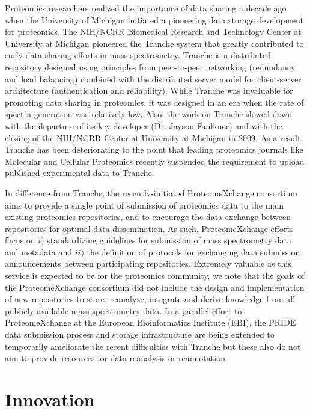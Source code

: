 \documentclass[arial,11pt]{article}
\begin{document}
Proteomics researchers realized the importance of data sharing a decade ago when the University of Michigan initiated a pioneering data storage development for proteomics. The NIH/NCRR Biomedical Research and Technology Center at University at Michigan pioneered the Tranche system that greatly contributed to early data sharing efforts in mass spectrometry.  Tranche is a distributed repository designed using principles from peer-to-peer networking (redundancy and load balancing) combined with the distributed server model for client-server architecture (authentication and reliability). While Tranche was invaluable for promoting data sharing in proteomics, it was designed in an era when the rate of spectra generation was relatively low.  Also, the work on Tranche slowed down with the departure of its key developer (Dr. Jayson Faulkner) and with the closing of the NIH/NCRR Center at University at Michigan in 2009.  As a result, Tranche has been deteriorating to the point that leading proteomics journals like Molecular and Cellular Proteomics recently suspended the requirement to upload published experimental data to Tranche.

In difference from Tranche, the recently-initiated ProteomeXchange consortium aims to provide a single point of submission of proteomics data to the main existing proteomics repositories, and to encourage the data exchange between repositories for optimal data dissemination. As such, ProteomeXchange efforts focus on $i)$ standardizing guidelines for submission of mass spectrometry data and metadata and $ii)$ the definition of protocols for exchanging data submission announcements between participating repositories. Extremely valuable as this service is expected to be for the proteomics community, we note that the goals of the ProteomeXchange consortium did not include the design and implementation of new repositories to store, reanalyze, integrate and derive knowledge from all publicly available mass spectrometry data. In a parallel effort to ProteomeXchange at the European Bioinformatics Institute (EBI), the PRIDE data submission process and storage infrastructure are being extended to temporarily ameliorate the recent difficulties with Tranche but these also do not aim to provide resources for data reanalysis or reannotation.

\section{Innovation}
\end{document}
